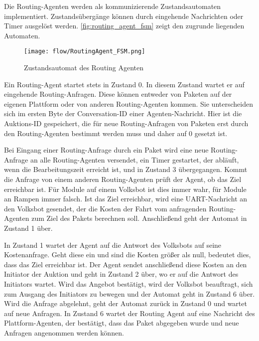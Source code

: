 Die Routing-Agenten werden als kommunizierende Zustandsautomaten implementiert. Zustandsübergänge können durch eingehende Nachrichten oder Timer ausgelöst werden. \autoref{fig:routing_agent_fsm} zeigt den zugrunde liegenden Automaten.

\begin{figure}[!ht]
  \centering
    \texttt{[image: flow/RoutingAgent\_FSM.png]}
    \caption{Zustandsautomat des Routing Agenten}
    \label{fig:routing_agent_fsm}
\end{figure}

Ein Routing-Agent startet stets in Zustand 0. In diesem Zustand wartet er auf eingehende Routing-Anfragen. Diese können entweder von Paketen auf der eigenen Plattform oder von anderen Routing-Agenten kommen. Sie unterscheiden sich im ersten Byte der Conversation-ID einer Agenten-Nachricht. Hier ist die Auktions-ID gespeichert, die für neue Routing-Anfragen von Paketen erst durch den Routing-Agenten bestimmt werden muss und daher auf 0 gesetzt ist. 

Bei Eingang einer Routing-Anfrage durch ein Paket wird eine neue Routing-Anfrage an alle Routing-Agenten versendet, ein Timer gestartet, der abläuft, wenn die Bearbeitungszeit erreicht ist, und in Zustand 3 übergegangen. Kommt die Anfrage von einem anderen Routing-Agenten prüft der Agent, ob das Ziel erreichbar ist. Für Module auf einem Volksbot ist dies immer wahr, für Module an Rampen immer falsch. Ist das Ziel erreichbar, wird eine UART-Nachricht an den Volksbot gesendet, der die Kosten der Fahrt vom anfragenden Routing-Agenten zum Ziel des Pakets berechnen soll. Anschließend geht der Automat in Zustand 1 über.

In Zustand 1 wartet der Agent auf die Antwort des Volksbots auf seine Kostenanfrage. Geht diese ein und sind die Kosten größer als null, bedeutet dies, dass das Ziel erreichbar ist. Der Agent sendet anschließend diese Kosten an den Initiator der Auktion und geht in Zustand 2 über, wo er auf die Antwort des Initiators wartet. Wird das Angebot bestätigt, wird der Volksbot beauftragt, sich zum Ausgang des Initiators zu bewegen und der Automat geht in Zustand 6 über. Wird die Anfrage abgelehnt, geht der Automat zurück in Zustand 0 und wartet auf neue Anfragen. In Zustand 6 wartet der Routing Agent auf eine Nachricht des Plattform-Agenten, der bestätigt, dass das Paket abgegeben wurde und neue Anfragen angenommen werden können.


